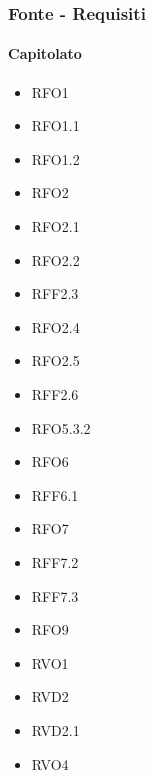 \subsubsection{Fonte - Requisiti}

\paragraph{Capitolato}
\quad
\begin{multicols}{3}
    \begin{itemize}
        \item RFO1
        \item RFO1.1
        \item RFO1.2
        \item RFO2
        \item RFO2.1
        \item RFO2.2
        \item RFF2.3
        \item RFO2.4
        \item RFO2.5
        \item RFF2.6
        \item RFO5.3.2
        \item RFO6
        \item RFF6.1
        \item RFO7
        \item RFF7.2
        \item RFF7.3
        \item RFO9
        \item RVO1
        \item RVD2
        \item RVD2.1
        \item RVO4
    \end{itemize}
\end{multicols}

